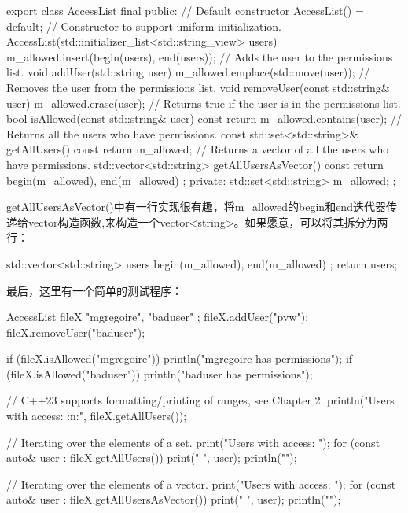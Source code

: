 \begin{cpp}
export class AccessList final
{
    public:
        // Default constructor
        AccessList() = default;
        // Constructor to support uniform initialization.
        AccessList(std::initializer_list<std::string_view> users)
        {
            m_allowed.insert(begin(users), end(users));
        }
        // Adds the user to the permissions list.
        void addUser(std::string user)
        {
            m_allowed.emplace(std::move(user));
        }
        // Removes the user from the permissions list.
        void removeUser(const std::string& user)
        {
            m_allowed.erase(user);
        }
        // Returns true if the user is in the permissions list.
        bool isAllowed(const std::string& user) const
        {
            return m_allowed.contains(user);
        }
        // Returns all the users who have permissions.
        const std::set<std::string>& getAllUsers() const
        {
            return m_allowed;
        }
        // Returns a vector of all the users who have permissions.
        std::vector<std::string> getAllUsersAsVector() const
        {
            return { begin(m_allowed), end(m_allowed) };
        }
    private:
        std::set<std::string> m_allowed;
};
\end{cpp}

getAllUsersAsVector()中有一行实现很有趣，将m\_allowed的begin和end迭代器传递给vector构造函数,来构造一个vector<string>。如果愿意，可以将其拆分为两行：

\begin{cpp}
std::vector<std::string> users { begin(m_allowed), end(m_allowed) };
return users;
\end{cpp}

最后，这里有一个简单的测试程序：

\begin{cpp}
AccessList fileX { "mgregoire", "baduser" };
fileX.addUser("pvw");
fileX.removeUser("baduser");

if (fileX.isAllowed("mgregoire")) { println("mgregoire has permissions"); }
if (fileX.isAllowed("baduser")) { println("baduser has permissions"); }

// C++23 supports formatting/printing of ranges, see Chapter 2.
println("Users with access: {:n:}", fileX.getAllUsers());

// Iterating over the elements of a set.
print("Users with access: ");
for (const auto& user : fileX.getAllUsers()) { print("{} ", user); }
println("");

// Iterating over the elements of a vector.
print("Users with access: ");
for (const auto& user : fileX.getAllUsersAsVector()) { print("{} ", user); }
println("");
\end{cpp}

